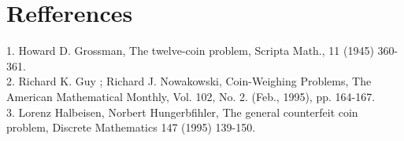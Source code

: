 \section{Refferences}
1. Howard D. Grossman, The twelve-coin problem, Scripta Math., 11 (1945) 360-361.  \\
2. Richard K. Guy ; Richard J. Nowakowski,  Coin-Weighing Problems, The American Mathematical Monthly, Vol. 102, No. 2. (Feb., 1995), pp. 164-167.  \\
3. Lorenz Halbeisen, Norbert Hungerbfihler, The general counterfeit coin problem, Discrete Mathematics 147 (1995) 139-150.  \\
